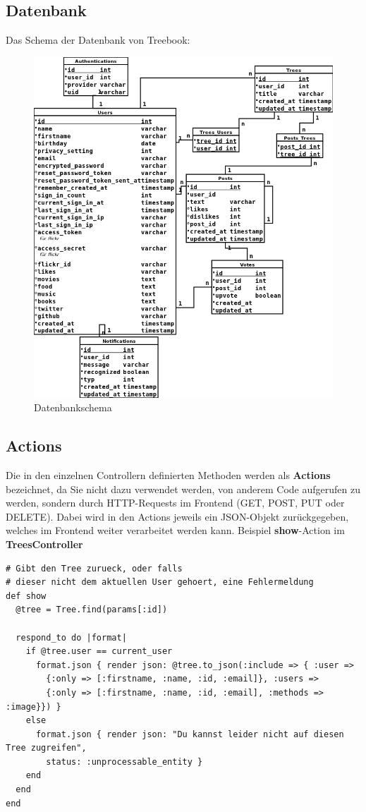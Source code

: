 \documentclass[10pt,a4paper]{book}
\makeatletter
\def\ScaleIfNeeded{%
\ifdim\Gin@nat@width>\linewidth
\linewidth
\else
\Gin@nat@width
\fi
}
\makeatother
\begin{document}
\subsection{Datenbank}
Das Schema der Datenbank von Treebook:
\begin{figure}[htbp]
\centering
\includegraphics[width=\ScaleIfNeeded]{Pictures/db.png}%
\caption{Datenbankschema}%
\end{figure}

\subsection{Actions}
Die in den einzelnen Controllern definierten Methoden werden als \textbf{Actions} bezeichnet, da Sie nicht dazu verwendet werden, von anderem Code aufgerufen zu werden, sondern durch HTTP-Requests im Frontend (GET, POST, PUT oder DELETE). Dabei wird in den Actions jeweils ein JSON-Objekt zurückgegeben, welches im Frontend weiter verarbeitet werden kann.
Beispiel \textbf{show}-Action im \textbf{TreesController}
\begin{lstlisting}
# Gibt den Tree zurueck, oder falls
# dieser nicht dem aktuellen User gehoert, eine Fehlermeldung
def show
  @tree = Tree.find(params[:id])

  respond_to do |format|
    if @tree.user == current_user
      format.json { render json: @tree.to_json(:include => { :user => 
      	{:only => [:firstname, :name, :id, :email]}, :users => 
      	{:only => [:firstname, :name, :id, :email], :methods => :image}}) }
    else
      format.json { render json: "Du kannst leider nicht auf diesen Tree zugreifen", 
      	status: :unprocessable_entity }
    end
  end
end
\end{lstlisting}
\end{document}
